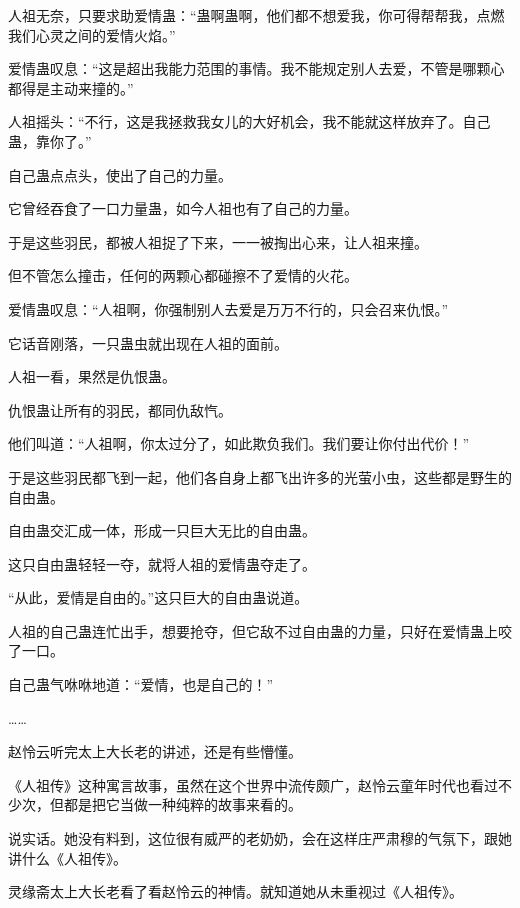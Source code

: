 
\begin{this_body}



人祖无奈，只要求助爱情蛊：“蛊啊蛊啊，他们都不想爱我，你可得帮帮我，点燃我们心灵之间的爱情火焰。”

爱情蛊叹息：“这是超出我能力范围的事情。我不能规定别人去爱，不管是哪颗心都得是主动来撞的。”

人祖摇头：“不行，这是我拯救我女儿的大好机会，我不能就这样放弃了。自己蛊，靠你了。”

自己蛊点点头，使出了自己的力量。

它曾经吞食了一口力量蛊，如今人祖也有了自己的力量。

于是这些羽民，都被人祖捉了下来，一一被掏出心来，让人祖来撞。

但不管怎么撞击，任何的两颗心都碰擦不了爱情的火花。

爱情蛊叹息：“人祖啊，你强制别人去爱是万万不行的，只会召来仇恨。”

它话音刚落，一只蛊虫就出现在人祖的面前。

人祖一看，果然是仇恨蛊。

仇恨蛊让所有的羽民，都同仇敌忾。

他们叫道：“人祖啊，你太过分了，如此欺负我们。我们要让你付出代价！”

于是这些羽民都飞到一起，他们各自身上都飞出许多的光萤小虫，这些都是野生的自由蛊。

自由蛊交汇成一体，形成一只巨大无比的自由蛊。

这只自由蛊轻轻一夺，就将人祖的爱情蛊夺走了。

“从此，爱情是自由的。”这只巨大的自由蛊说道。

人祖的自己蛊连忙出手，想要抢夺，但它敌不过自由蛊的力量，只好在爱情蛊上咬了一口。

自己蛊气咻咻地道：“爱情，也是自己的！”

……

赵怜云听完太上大长老的讲述，还是有些懵懂。

《人祖传》这种寓言故事，虽然在这个世界中流传颇广，赵怜云童年时代也看过不少次，但都是把它当做一种纯粹的故事来看的。

说实话。她没有料到，这位很有威严的老奶奶，会在这样庄严肃穆的气氛下，跟她讲什么《人祖传》。

灵缘斋太上大长老看了看赵怜云的神情。就知道她从未重视过《人祖传》。


\end{this_body}

